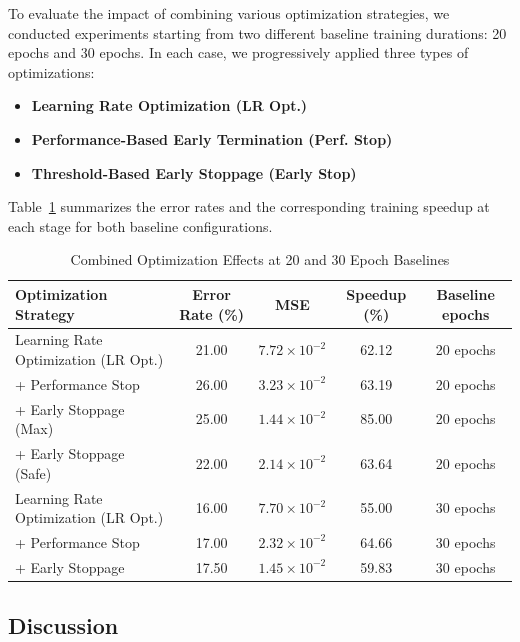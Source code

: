 To evaluate the impact of combining various optimization strategies, we conducted experiments starting from two different baseline training durations: 20 epochs and 30 epochs. In each case, we progressively applied three types of optimizations:
\begin{itemize}
    \item \textbf{Learning Rate Optimization (LR Opt.)}
    \item \textbf{Performance-Based Early Termination (Perf. Stop)}
    \item \textbf{Threshold-Based Early Stoppage (Early Stop)}
\end{itemize}

Table~\ref{tab:combined_optimizations} summarizes the error rates and the corresponding training speedup at each stage for both baseline configurations.

\begin{table}[h!]
\centering
\begin{tabular}{|p{4.5cm}|c|c|c|c|}
\hline
\textbf{Optimization Strategy} & \textbf{Error Rate (\%)} & \textbf{MSE} & \textbf{Speedup (\%)} & \textbf{Baseline epochs} \\ \hline
Learning Rate Optimization (LR Opt.)         & 21.00  & \( 7.72 \times 10^{-2} \) & 62.12 & 20 epochs \\ \hline
+ Performance Stop                           & 26.00 & \( 3.23 \times 10^{-2} \)  & 63.19 & 20 epochs \\ \hline
+ Early Stoppage (Max)                       & 25.00 & \( 1.44 \times 10^{-2} \)   & 85.00 & 20 epochs \\ \hline
+ Early Stoppage (Safe)                      & 22.00 & \( 2.14 \times 10^{-2} \)  & 63.64 & 20 epochs \\ \hline
\hline
Learning Rate Optimization (LR Opt.)         & 16.00 & \( 7.70 \times 10^{-2} \)  & 55.00 & 30 epochs \\ \hline
+ Performance Stop                           & 17.00 & \( 2.32 \times 10^{-2} \)  & 64.66 & 30 epochs \\ \hline
+ Early Stoppage                             & 17.50 & \( 1.45 \times 10^{-2} \)   & 59.83 & 30 epochs \\ \hline
\end{tabular}
\caption{Combined Optimization Effects at 20 and 30 Epoch Baselines}
\label{tab:combined_optimizations}
\end{table}


\subsection*{Discussion}

